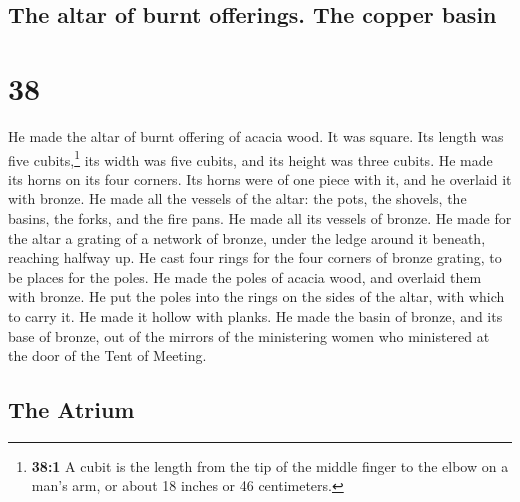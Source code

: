 \hypertarget{the-altar-of-burnt-offerings.-the-copper-basin}{%
\subsection{The altar of burnt offerings. The copper
basin}\label{the-altar-of-burnt-offerings.-the-copper-basin}}

\hypertarget{section-37}{%
\section{38}\label{section-37}}

 He made the altar of burnt offering of acacia wood. It
was square. Its length was five cubits,\footnote{\textbf{38:1} A cubit
  is the length from the tip of the middle finger to the elbow on a
  man's arm, or about 18 inches or 46 centimeters.} its width was five
cubits, and its height was three cubits.  He made its
horns on its four corners. Its horns were of one piece with it, and he
overlaid it with bronze.  He made all the vessels of the
altar: the pots, the shovels, the basins, the forks, and the fire pans.
He made all its vessels of bronze.  He made for the altar
a grating of a network of bronze, under the ledge around it beneath,
reaching halfway up.  He cast four rings for the four
corners of bronze grating, to be places for the poles.  He
made the poles of acacia wood, and overlaid them with bronze.
 He put the poles into the rings on the sides of the
altar, with which to carry it. He made it hollow with planks.
 He made the basin of bronze, and its base of bronze, out
of the mirrors of the ministering women who ministered at the door of
the Tent of Meeting.

\hypertarget{the-atrium}{%
\subsection{The Atrium}\label{the-atrium}}

